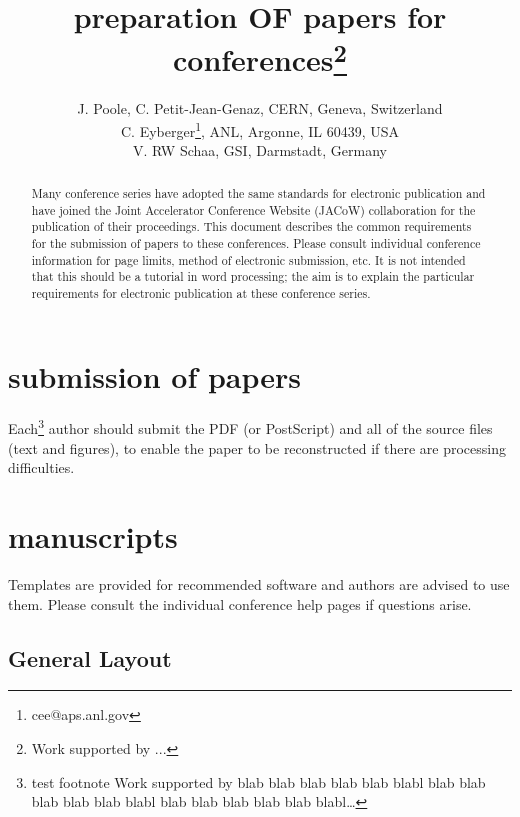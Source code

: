 \documentclass[acus]{jacow}
\begin{document}
\title{preparation OF papers for  conferences\thanks{Work supported by ...}}

\author{J. Poole, C. Petit-Jean-Genaz, CERN, Geneva, Switzerland\\
        C. Eyberger\thanks{cee@aps.anl.gov}, ANL, Argonne, IL 60439, USA\\
        V. RW Schaa, GSI,  Darmstadt, Germany}

\maketitle

%
\begin{abstract}
   Many conference series have adopted the same standards for electronic
   publication and have joined the Joint Accelerator Conference Website (JACoW)
   collaboration for the publication of their proceedings.
   This document describes the common requirements for the submission of papers
   to these conferences. Please consult individual conference
   information for page limits, method of electronic submission, etc.
   It is not intended that this should be a tutorial in word processing;
   the aim is to explain the particular requirements for electronic publication
   at these conference series.
\end{abstract}

\section{submission of papers}
Each\footnote{test footnote Work supported by blab blab blab blab blab blabl blab blab blab blab blab blabl blab blab blab blab blab blabl\ldots} author should submit the PDF (or PostScript) and all of the source files (text and figures),
to enable the paper to be reconstructed if there are processing difficulties.

\section{manuscripts}
Templates are provided for recommended software and authors are
advised to use them. Please consult the individual conference help pages if questions
arise.

\subsection{General Layout}
\end{document}
